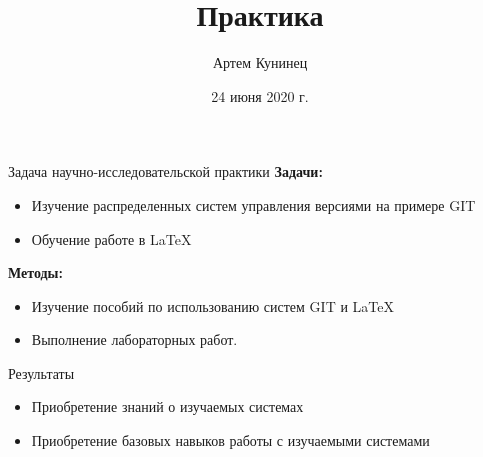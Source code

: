\documentclass{beamer}
\begin{document}
\title {Практика}  
\author {Артем Кунинец} 	
\date{24 июня 2020 г.}
\begin{frame}
		\titlepage
\end{frame}
	
\begin{frame}{Задача научно-исследовательской практики}
	\textbf{Задачи:}
	\begin{itemize}
		\item Изучение распределенных систем управления версиями на примере GIT
		\item Обучение работе в LaTeX
	\end{itemize}
\textbf{Методы:}
\begin{itemize}
	\item Изучение пособий по использованию систем GIT и LaTeX
	\item Выполнение лабораторных работ.

\end{itemize}
\end{frame}
	
	\begin{frame}{Результаты}
		\begin{itemize}
			\item Приобретение знаний о изучаемых системах
			\item Приобретение базовых навыков работы с изучаемыми системами
		\end{itemize}
	\end{frame}	
\end{document}

